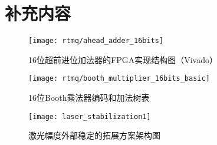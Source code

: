 
\chapter{补充内容}

\begin{figure}
    \centering
    \texttt{[image: rtmq/ahead\_adder\_16bits]}
    \caption[16位超前进位加法器的FPGA实现结构图]{16位超前进位加法器的FPGA实现结构图（Vivado）\label{fig:ahead_adder_16bits}}
\end{figure}


\begin{figure}
    \centering
    \texttt{[image: rtmq/booth\_multiplier\_16bits\_basic]}
    \caption[16位Booth乘法器编码和加法树表]{16位Booth乘法器编码和加法树表\label{fig:booth_multiplier_32bits_basic}}
\end{figure}

\begin{figure}
    \centering
    \texttt{[image: laser\_stabilization1]}
    \caption[激光幅度外部稳定的拓展方案架构图]{激光幅度外部稳定的拓展方案架构图\label{fig:laser_stabilization}}
\end{figure}

